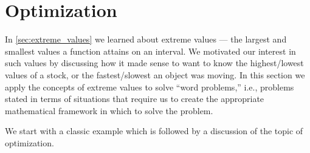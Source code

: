 \section{Optimization}\label{sec:optimization}

In \autoref{sec:extreme_values} we learned about extreme values --- the largest and smallest values a function attains on an interval. We motivated our interest in such values by discussing how it made sense to want to know the highest/lowest values of a stock, or the fastest/slowest an object was moving. In this section we apply the concepts of extreme values to solve ``word problems,'' i.e., problems stated in terms of situations that require us to create the appropriate mathematical framework in which to solve the problem.


We start with a classic example which is followed by a discussion of the topic of optimization.

